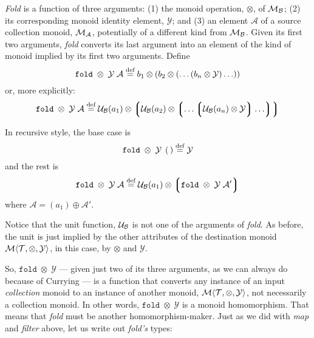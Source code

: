 \emph{Fold} is a function of three arguments: (1) the monoid operation, $\otimes$, of $\mathcal{M}_{\mathcal{B}}$; (2) its corresponding monoid identity element, $\mathcal{Y}$; and (3) an element $\mathcal{A}$ of a source collection monoid, $\mathcal{M}_{\mathcal{A}}$, potentially of a different kind from $\mathcal{M}_{\mathcal{B}}$. Given its first two arguments, \emph{fold} converts its last argument into an element of the kind of monoid implied by its first two arguments. Define
\begin{equation}
    \mathtt{fold}\;\otimes\;\mathcal{Y}\;\mathcal{A} \overset{\text{def}}{=}
        b_{1}\otimes
        (b_{2}\otimes
        (\ldots(b_{n}\otimes
        \mathit{\mathcal{Y}})\ldots))
  \label{eqn:folddef}
\end{equation}
or, more explicitly:
  $$ \mathtt{fold}\;\otimes\;\mathcal{Y}\;\mathcal{A} \overset{\text{def}}{=}
        \mathcal{U}_{\mathcal{B}}(a_1)\otimes
        \left\lgroup
        \mathcal{U}_{\mathcal{B}}(a_2)\otimes
        \left\lgroup\ldots\left\lgroup
        \mathcal{U}_{\mathcal{B}}(a_n)\otimes
        \mathit{\mathcal{Y}}
        \right\rgroup\ldots\right\rgroup
        \right\rgroup $$


In recursive style, the base case is
\begin{equation}
  \mathtt{fold}\;\otimes\;\mathcal{Y}\;\left(\,\right)\overset{\text{def}}{=}\mathcal{Y}
\end{equation}
and the rest is
\begin{equation}
  \mathtt{fold}\;\otimes\;\mathcal{Y}\;\mathcal{A} \overset{\text{def}}{=}
    \mathcal{U}_{\mathcal{B}}(a_1)\otimes
    \left\lgroup
    \mathtt{fold}\;\otimes\;\mathcal{Y}\;\mathcal{A}'
    \right\rgroup
\end{equation}
where $\mathcal{A}=(a_1)\oplus\mathcal{A}'$. 


Notice that the unit function, $\mathcal{U}_{\mathcal{B}}$ is not one of the arguments of \emph{fold}. As before, the unit is just implied by the other attributes of the destination monoid $\mathcal{M}\langle{\mathcal{T}},{\otimes},{\mathcal{Y}}\rangle$, in this case, by $\otimes$ and $\mathcal{Y}$.


So, $\mathtt{fold}\;\otimes\;\mathcal{Y}$ --- given just two of its three arguments, as we can always do because of Currying --- is a function that converts any instance of an input \emph{collection} monoid to an instance of another monoid, $\mathcal{M}\langle{\mathcal{T}},{\otimes},{\mathcal{Y}}\rangle$, not necessarily a collection monoid. In other words, $\mathtt{fold}\;\otimes\;\mathcal{Y}$ is a monoid homomorphism. That means that \emph{fold} must be another homomorphism-maker. Just as we did with \emph{map} and \emph{filter} above, let us write out \emph{fold's} types:


